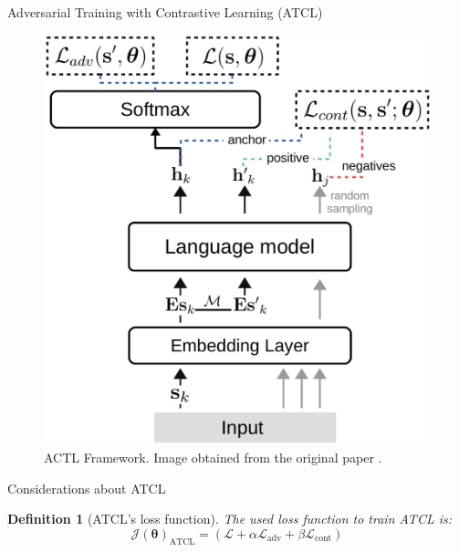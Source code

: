 \documentclass[aspectratio=169]{beamer}
\newtheorem{defi}{Definition}
\begin{document}
  \begin{frame}{Adversarial Training with Contrastive Learning (ATCL)}
    
    \begin{figure}
    \centering
    \includegraphics[scale=0.3]{embed}
    \caption{ACTL Framework. Image obtained from the original paper \citep{DBLP:journals/corr/abs-2109-09075}.}
    \end{figure}
  \end{frame}

  \begin{frame}{Considerations about ATCL}

    
      

    \begin{defi}[ATCL's loss function]
      The used loss function to train ATCL is:
      \[
      \mathcal J(\mathbf \theta)_{\text{ATCL}} =  \left( \mathcal L + \alpha \mathcal L_{\text{adv}} + \beta \mathcal L_{\text{cont}}\right)  
      \]
      \vspace{0.01cm}
    \end{defi}

    \end{frame}
\end{document}

